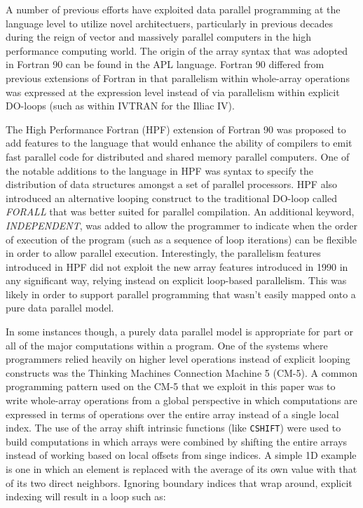 A number of previous efforts have exploited data parallel programming
at the language level to utilize novel architectuers, particularly
in previous decades during the reign of vector and massively
parallel computers in the high performance computing world.  The
origin of the array syntax that was adopted in Fortran 90 can be found
in the APL language\cite{iverson79apl}.  Fortran 90 differed from
previous extensions of Fortran in that parallelism within whole-array operations
was expressed at the expression level instead of via parallelism within explicit
DO-loops (such as within IVTRAN for the Illiac IV). 

The High Performance Fortran (HPF) extension of Fortran 90 was
proposed to add features to the language that would enhance the
ability of compilers to emit fast parallel code for distributed and
shared memory parallel computers\cite{koelbel94hpf}.  One of the
notable additions to the language in HPF was syntax to specify the
distribution of data structures amongst a set of parallel processors.
HPF also introduced an alternative looping construct to the
traditional DO-loop called \emph{FORALL} that was better suited for
parallel compilation.  An additional keyword, \emph{INDEPENDENT}, was
added to allow the programmer to indicate when the order of execution
of the program (such as a sequence of loop iterations) can be flexible
in order to allow parallel execution.  Interestingly, the parallelism
features introduced in HPF did not exploit the new array features
introduced in 1990 in any significant way, relying instead on explicit
loop-based parallelism.  This was likely in order to support parallel
programming that wasn't easily mapped onto a pure data parallel model.

In some instances though, a purely data parallel model is appropriate
for part or all of the major computations within a program.  One of
the systems where programmers relied heavily on higher level
operations instead of explicit looping constructs was the Thinking
Machines Connection Machine 5 (CM-5).  A common programming pattern
used on the CM-5 that we exploit in this paper was to write
whole-array operations from a global perspective in which computations
are expressed in terms of operations over the entire array instead of
a single local index.  The use of the array shift intrinsic functions
(like {\tt CSHIFT}) were used to build computations in which arrays
were combined by shifting the entire arrays instead of working based
on local offsets from singe indices.  A simple 1D example is one in
which an element is replaced with the average of its own value with
that of its two direct neighbors.  Ignoring boundary indices that wrap
around, explicit indexing will result in a loop such as:


